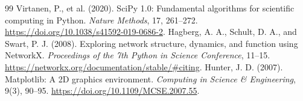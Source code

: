 \begin{thebibliography}{99}
 Virtanen, P., et al. (2020). SciPy 1.0: Fundamental algorithms for scientific computing in Python. \emph{Nature Methods}, 17, 261--272. \url{https://doi.org/10.1038/s41592-019-0686-2}.
 Hagberg, A. A., Schult, D. A., and Swart, P. J. (2008). Exploring network structure, dynamics, and function using NetworkX. \emph{Proceedings of the 7th Python in Science Conference}, 11--15. \url{https://networkx.org/documentation/stable/\#citing}.
 Hunter, J. D. (2007). Matplotlib: A 2D graphics environment. \emph{Computing in Science \& Engineering}, 9(3), 90--95. \url{https://doi.org/10.1109/MCSE.2007.55}.
\end{thebibliography}